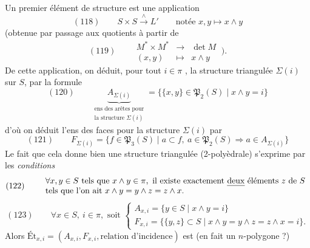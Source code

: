 \documentclass[11pt,a4paper]{article}
\begin{document}
Un premier élément de structure est une application
\[
  (118)\qquad S\times S \xrightarrow{\ \wedge\ } L' \qquad
  \text{notée $x,y \mapsto x\wedge y$}
\]
 (obtenue par passage aux
quotients à partir de
\[
  (119)\qquad
  \begin{array}{ccc}
    M^{*}\times M^{*} & \longrightarrow & \det M\\
    (x,y) & \longmapsto & x\wedge y
  \end{array}
  \ \Bigr).
\]
De cette application, on déduit, \struck{\ill{}} pour tout $i\in\pi$
, la structure triangulée $\Sigma(i)$ sur $S$, par la formule
\[
  (120)\qquad
  \underbrace{A_{\Sigma(i)}}_{\substack{\text{ens des arêtes pour}\\
  \text{la structure } \Sigma(i)}}
  = \bigl\{\{x,y\}\in\mathfrak{P}_2(S) \mid x\wedge y = i\bigr\}
\]
d'où on déduit l'ens des faces pour la structure $\Sigma(i)$ par
\[
  (121)\qquad F_{\Sigma(i)} = \bigl\{ f\in\mathfrak{P}_3(S) \mid
  a\subset f,\ a\in\mathfrak{P}_2(S) \Longrightarrow a\in A_{\Sigma(i)}\bigr\}
\]
Le fait que cela donne bien une structure triangulée (2-polyèdrale) s'exprime par
les \emph{conditions} 
\[
  (122)\qquad
  \begin{array}{l}
    \forall x,y\in S \text{ tels que } x\wedge y\in\pi,
      \text{ il existe exactement \emph{deux} éléments $z$ de $S$}\\
    \text{tels que l'on ait } x\wedge y = y\wedge z = z\wedge x .
  \end{array}
\]
\[
  (123)\qquad \forall x\in S,\ i\in\pi, \text{ soit }
  \begin{cases}
    A_{x,i} = \{y\in S \mid x\wedge y = i\}\\
    F_{x,i} = \bigl\{\{y,z\}\subset S \mid x\wedge y = y\wedge z = z\wedge x = i\bigr\}.
  \end{cases}
\]
Alors $\mathrm{Ét}_{x,i}=(A_{x,i}, F_{x,i}, \text{relation d'incidence})$ est
 (en fait un $n$-polygone ?)
\end{document}
